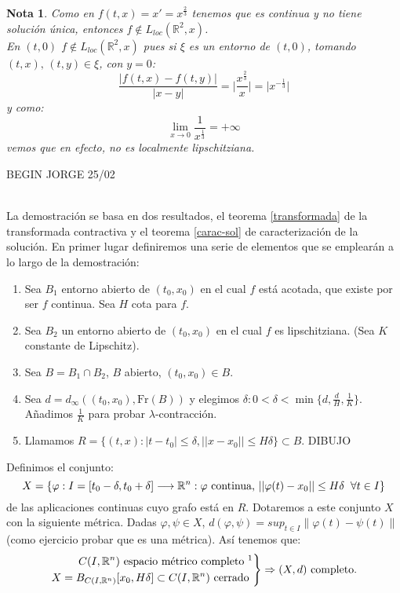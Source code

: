 \documentclass{article}
\makeatletter
\newenvironment{rcases}
{\left.\begin{aligned}}
	{\end{aligned}\right\rbrace}
\providecommand{\norm}[1]{\lVert#1\rVert}
\providecommand{\abs}[1]{\lvert#1\rvert}
\theoremstyle{theorem-style}  %
\theoremstyle{definition-style}
\newtheorem*{note}{Nota} %
\theoremstyle{example-style}
\renewenvironment{proof}[1][\proofname]{\par
	\pushQED{\qed}%
	\normalfont \topsep6\p@\@plus6\p@\relax
	\list{}{%
		\settowidth{\leftmargin}{\quad:\hskip\labelsep}%
		\setlength{\labelwidth}{0pt}%
		\setlength{\itemindent}{-\leftmargin}%
	}%
	\item[\hskip\labelsep\itshape#1\@addpunct{:}]\ignorespaces
}{%
	\popQED\endlist\@endpefalse
}
\makeatother
\begin{document}
\begin{note}
	Como en $f(t, x) = x' = x^{\frac{2}{3}}$ tenemos que es continua y no tiene solución única, entonces $f \notin L_{loc}(\mathbb{R}^2,x)$. \\
	En $(t, 0)$ $f \notin L_{loc}(\mathbb{R}^2,x)$ pues si $\xi$ es un entorno de $(t, 0)$, tomando $(t, x), \, (t, y) \in \xi$, con $y=0$:
	\[\frac{\abs{f(t, x) - f(t, y)}}{\abs{x - y}} = \abs{\frac{x^{\frac{2}{3}}}{x}} = \abs{x^{-\frac{1}{3}}}\]
	y como:
	\[\lim\limits_{x \to 0} \frac{1}{x^{\frac{1}{3}}} = +\infty\] 
	vemos que en efecto, no es localmente lipschitziana.
\end{note}
	BEGIN JORGE 25/02
\begin{proof}\ \\
	La demostración se basa en dos resultados, el teorema \ref{transformada} de la transformada contractiva y el teorema \ref{carac-sol} de caracterización de la solución. En primer lugar definiremos una serie de elementos que se emplearán a lo largo de la demostración:
	\begin{enumerate}
		\item Sea $ B_1 $  entorno abierto de $ (t_0,x_0) $ en el cual $ f $ está acotada, que existe por ser $ f $ continua. Sea $ H $ cota para $ f $.
		
		\item Sea $ B_2 $ un entorno abierto de $ (t_0,x_0) $ en el cual $ f $ es lipschitziana. (Sea $ K $ constante de Lipschitz).
		
		\item Sea $ B=B_1 \cap B_2 $, $ B $ abierto, $ (t_0,x_0) \in B$.
		
		\item Sea $ d=d_\infty((t_0,x_0),\text{Fr}(B)) $ y elegimos $ \delta : 0<\delta <\min \{d,\frac{d}{H},\frac{1}{K}\} $. Añadimos $ \frac{1}{K} $ para probar $ \lambda $-contracción.
		\item Llamamos $ R=\{(t,x) : |t-t_0|\leq \delta, ||x-x_0||\leq H\delta \}\subset B $.
		DIBUJO
	\end{enumerate}
	
	Definimos el conjunto:
	 \[X=\{\varphi : I=[t_0-\delta, t_0+\delta]\longrightarrow \mathbb{R}^n : \varphi \text{ continua, } ||\varphi(t)-x_0||\leq H \delta \hspace{0,2cm} \forall t \in I  \} \]
	de las aplicaciones continuas cuyo grafo está en $R$. Dotaremos a este conjunto $ X $ con la siguiente métrica. Dadas $\varphi, \psi \in X$, $d(\varphi, \psi) = sup_{t \in I} \norm{\varphi (t) - \psi (t)}$ (como ejercicio probar que es una métrica). Así tenemos que:\\
	\[\begin{rcases}
		C(I, \mathbb{R}^n) \text{ espacio métrico completo \footnotemark}\\
		X = B_{C(I, \mathbb{R}^n)} [x_0, H\delta] \subset C(I, \mathbb{R}^n) \text{ cerrado } \\
	\end{rcases} \Rightarrow (X, d) \text{ completo.}\]
	

\end{proof}
\end{document}
